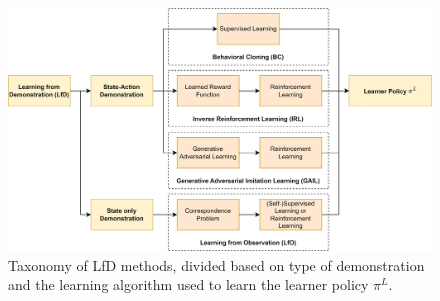 \begin{figure}[t]
    \centering
    \includegraphics[width=\textwidth]{figures/images/il_taxonomy.jpg}
    \caption{Taxonomy of LfD methods, divided based on type of demonstration and the learning algorithm used to learn the learner policy $\pi^{L}$.}
    \label{fig:il_taxonomy}
    
\end{figure}
